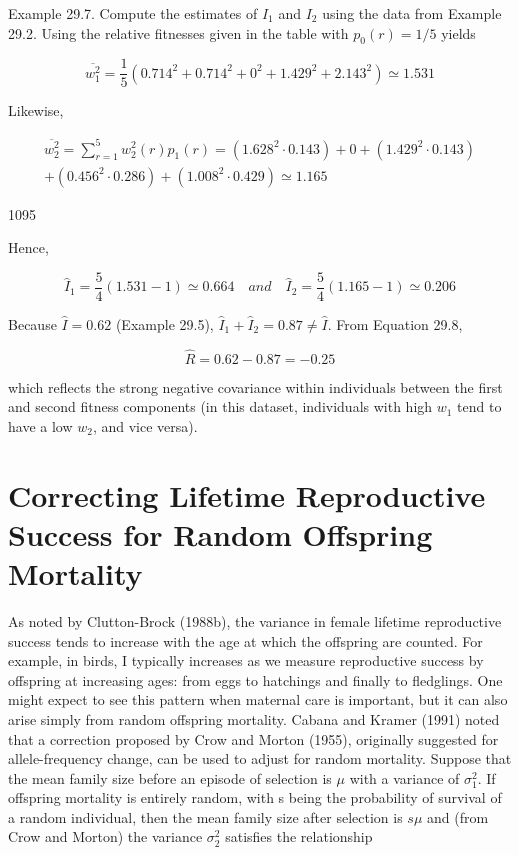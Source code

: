 \documentclass{article}
\begin{document}
Example 29.7. Compute the estimates of  $ I_1 $ and  $ I_2 $ using the data from Example 29.2. Using the relative fitnesses given in the table with  $ p_0(r) = 1/5 $ yields

\begin{equation}
\overline{w_{1}^{2}}=\frac{1}{5}\left(0.714^{2}+0.714^{2}+0^{2}+1.429^{2}+2.143^{2}\right)\simeq1.531
\end{equation}

Likewise,

\begin{equation}
\begin{aligned}\overline{w_{2}^{2}}=\sum_{r=1}^{5}w_{2}^{2}(r)p_{1}(r)=\left(1.628^{2}\cdot0.143\right)+0+\left(1.429^{2}\cdot0.143\right)\\+\left(0.456^{2}\cdot0.286\right)+\left(1.008^{2}\cdot0.429\right)\simeq1.165\end{aligned}
\end{equation}

1095

Hence,

\begin{equation}
\widehat{I}_{1}=\frac{5}{4}\left(1.531-1\right)\simeq0.664\quad and\quad\widehat{I}_{2}=\frac{5}{4}\left(1.165-1\right)\simeq0.206
\end{equation}

Because  $ \widehat{I} = 0.62 $ (Example 29.5),  $ \widehat{I}_1 + \widehat{I}_2 = 0.87 \neq \widehat{I} $. From Equation 29.8,

\begin{equation}
\widehat{R}=0.62-0.87=-0.25
\end{equation}

which reflects the strong negative covariance within individuals between the first and second fitness components (in this dataset, individuals with high  $ w_{1} $ tend to have a low  $ w_{2} $, and vice versa).

\section{Correcting Lifetime Reproductive Success for Random Offspring Mortality}
As noted by Clutton-Brock (1988b), the variance in female lifetime reproductive success tends to increase with the age at which the offspring are counted. For example, in birds, I typically increases as we measure reproductive success by offspring at increasing ages: from eggs to hatchings and finally to fledglings. One might expect to see this pattern when maternal care is important, but it can also arise simply from random offspring mortality. Cabana and Kramer (1991) noted that a correction proposed by Crow and Morton (1955), originally suggested for allele-frequency change, can be used to adjust for random mortality. Suppose that the mean family size before an episode of selection is  $ \mu $ with a variance of  $ \sigma_1^2 $. If offspring mortality is entirely random, with s being the probability of survival of a random individual, then the mean family size after selection is  $ s\mu $ and (from Crow and Morton) the variance  $ \sigma_2^2 $ satisfies the relationship
\end{document}
